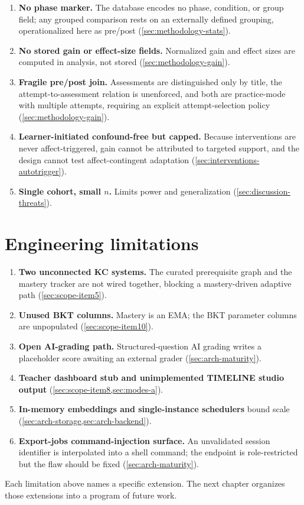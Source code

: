 \begin{enumerate}
  \item \textbf{No phase marker.} The database encodes no phase,
  condition, or group field; any grouped comparison rests on an externally
  defined grouping, operationalized here as pre/post
  (\cref{sec:methodology-stats}).
  \item \textbf{No stored gain or effect-size fields.} Normalized gain and
  effect sizes are computed in analysis, not stored
  (\cref{sec:methodology-gain}).
  \item \textbf{Fragile pre/post join.} Assessments are distinguished only
  by title, the attempt-to-assessment relation is unenforced, and both are
  practice-mode with multiple attempts, requiring an explicit
  attempt-selection policy (\cref{sec:methodology-gain}).
  \item \textbf{Learner-initiated confound-free but capped.} Because
  interventions are never affect-triggered, gain cannot be attributed to
  targeted support, and the design cannot test affect-contingent adaptation
  (\cref{sec:interventions-autotrigger}).
  \item \textbf{Single cohort, small $n$.} Limits power and
  generalization (\cref{sec:discussion-threats}).
\end{enumerate}

\section{Engineering limitations}
\label{sec:limitations-engineering}

\begin{enumerate}
  \item \textbf{Two unconnected KC systems.} The curated prerequisite
  graph and the mastery tracker are not wired together, blocking a
  mastery-driven adaptive path (\cref{sec:scope-item5}).
  \item \textbf{Unused BKT columns.} Mastery is an EMA; the BKT parameter
  columns are unpopulated (\cref{sec:scope-item10}).
  \item \textbf{Open AI-grading path.} Structured-question AI grading
  writes a placeholder score awaiting an external grader
  (\cref{sec:arch-maturity}).
  \item \textbf{Teacher dashboard stub and unimplemented TIMELINE studio
  output} (\cref{sec:scope-item8,sec:modes-a}).
  \item \textbf{In-memory embeddings and single-instance schedulers}
  bound scale (\cref{sec:arch-storage,sec:arch-backend}).
  \item \textbf{Export-jobs command-injection surface.} An unvalidated
  session identifier is interpolated into a shell command; the endpoint is
  role-restricted but the flaw should be fixed
  (\cref{sec:arch-maturity}).
\end{enumerate}

\medskip
\noindent Each limitation above names a specific extension. The next
chapter organizes those extensions into a program of future work.
